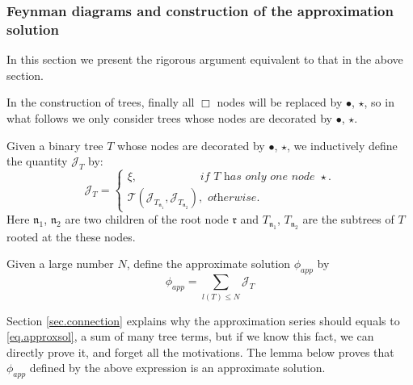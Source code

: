 \subsubsection{Feynman diagrams and construction of the approximation solution} In this section we present the rigorous argument equivalent to that in the above section. 

In the construction of trees, finally all $\Box$ nodes will be replaced by $\bullet$, $\star$, so in what follows we only consider trees whose nodes are decorated by $\bullet$, $\star$.

\begin{defn}\label{def.treeterms} Given a binary tree $T$ whose nodes are decorated by $\bullet$, $\star$,
we inductively define the quantity $\mathcal{J}_T$ by:
\begin{equation}\label{eq.treeterm}
    \mathcal{J}_T=
    \begin{cases}
    \xi, \qquad\qquad\quad\  \textit{ if $T$ has only one node $\star$.}
    \\
    \mathcal{T}(\mathcal{J}_{T_{\mathfrak{n}_1}}, \mathcal{J}_{T_{\mathfrak{n}_2}}), \textit{ otherwise.}
    \end{cases}
\end{equation}
Here $\mathfrak{n}_1$, $\mathfrak{n}_2$ are two children of the root node $\mathfrak{r}$ and $T_{\mathfrak{n}_1}$, $T_{\mathfrak{n}_2}$ are the subtrees of $T$ rooted at the these nodes.
\end{defn}

\begin{defn}
Given a large number $N$, define the approximate solution $\phi_{app}$ by
\begin{equation}\label{eq.approxsol}
    \phi_{app}=\sum_{l(T)\le N} \mathcal{J}_T
\end{equation}
\end{defn}

Section \ref{sec.connection} explains why the approximation series should equals to \eqref{eq.approxsol}, a sum of many tree terms, but if we know this fact, we can directly prove it, and forget all the motivations. The lemma below proves that $\phi_{app}$ defined by the above expression is an approximate solution.  

